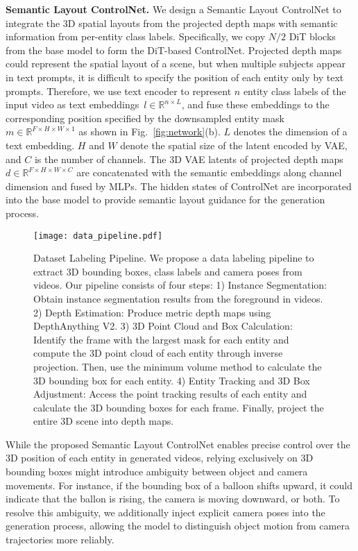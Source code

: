 \noindent\textbf{Semantic Layout ControlNet.} We design a Semantic Layout ControlNet to integrate the 3D spatial layouts from the projected depth maps with semantic information from per-entity class labels. Specifically, we copy $N/2$ DiT blocks from the base model to form the DiT-based ControlNet. Projected depth maps could represent the spatial layout of a scene, but when multiple subjects appear in text prompts, it is difficult to specify the position of each entity only by text prompts. Therefore, we use text encoder to represent $n$ entity class labels of the input video as text embeddings~$l\in\mathbb{R}^{n\times L}$, and fuse these embeddings to the corresponding position specified by the downsampled entity mask~$m\in\mathbb{R}^{F\times H\times W\times 1}$ as shown in Fig.~\ref{fig:network}(b). $L$ denotes the dimension of a text embedding. $H$ and $W$ denote the spatial size of the latent encoded by VAE, and $C$ is the number of channels. The 3D VAE latents of projected depth maps~$d\in\mathbb{R}^{F\times H\times W\times C}$ are concatenated with the semantic embeddings along channel dimension and fused by MLPs. The hidden states of ControlNet are incorporated into the base model to provide semantic layout guidance for the generation process.


\begin{figure*}[!t]
  \centering
\texttt{[image: data\_pipeline.pdf]}
  \caption{Dataset Labeling Pipeline. We propose a data labeling pipeline to extract 3D bounding boxes, class labels and camera poses from videos. Our pipeline consists of four steps: 1) Instance Segmentation: Obtain instance segmentation results from the foreground in videos. 2) Depth Estimation: Produce metric depth maps using DepthAnything V2. 3) 3D Point Cloud and Box Calculation: Identify the frame with the largest mask for each entity and compute the 3D point cloud of each entity through inverse projection. Then, use the minimum volume method to calculate the 3D bounding box for each entity. 4) Entity Tracking and 3D Box Adjustment: Access the point tracking results of each entity and calculate the 3D bounding boxes for each frame. Finally, project the entire 3D scene into depth maps.}
  \label{fig:dataset_pipeline}
  \vspace{-8pt}

\end{figure*}


While the proposed Semantic Layout ControlNet enables precise control over the 3D position of each entity in generated videos, relying exclusively on 3D bounding boxes might introduce ambiguity between object and camera movements. For instance, if the bounding box of a balloon shifts upward, it could indicate that the ballon is rising, the camera is moving downward, or both. To resolve this ambiguity, we additionally inject explicit camera poses into the generation process, allowing the model to distinguish object motion from camera trajectories more reliably.

